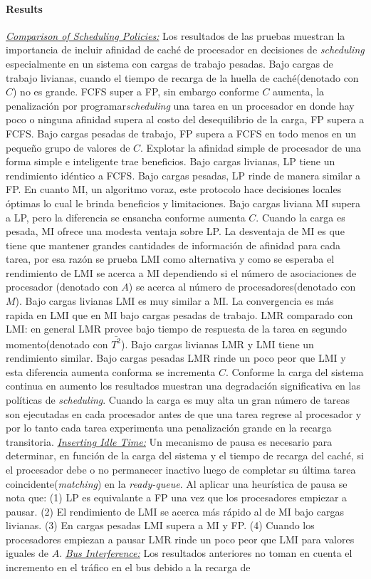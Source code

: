 \paragraph{\textnormal{\textbf{Results}}}
\underline{\textit{Comparison of Scheduling Policies:}} Los resultados de las pruebas muestran la importancia de incluir afinidad de caché de procesador en decisiones de \textit{scheduling} especialmente en un sistema con cargas de trabajo pesadas. Bajo cargas de trabajo livianas, cuando el tiempo de recarga de la huella de caché(denotado con $C$) no es grande. FCFS super a FP, sin embargo conforme $C$ aumenta, la penalización por programar\textit{scheduling} una tarea en un procesador en donde hay poco o ninguna afinidad supera al costo del desequilibrio de la carga, FP supera a FCFS. Bajo cargas pesadas de trabajo, FP supera a FCFS en todo menos en un pequeño grupo de valores de $C$. Explotar la afinidad simple de procesador de una forma simple e inteligente trae beneficios. Bajo cargas livianas, LP tiene un rendimiento idéntico a FCFS. Bajo cargas pesadas, LP rinde de manera similar a FP. En cuanto MI, un algoritmo voraz, este protocolo hace decisiones locales óptimas lo cual le brinda beneficios y limitaciones. Bajo cargas liviana MI supera a LP, pero la diferencia se ensancha conforme aumenta $C$. Cuando la carga es pesada, MI ofrece una modesta ventaja sobre LP. La desventaja de MI es que tiene que mantener grandes cantidades de información de afinidad para cada tarea, por esa razón se prueba LMI como alternativa y como se esperaba el rendimiento de LMI se acerca a MI dependiendo si el número de asociaciones de procesador (denotado con $A$) se acerca al número de procesadores(denotado con $M$). Bajo cargas livianas LMI es muy similar a MI. La convergencia es más rapida en LMI que en MI bajo cargas pesadas de trabajo. LMR comparado con LMI: en general LMR provee bajo tiempo de respuesta de la tarea en segundo momento(denotado con $\bar{T^2}$). Bajo cargas livianas LMR y LMI tiene un rendimiento similar. Bajo cargas pesadas LMR rinde un poco peor que LMI y esta diferencia aumenta conforma se incrementa $C$. Conforme la carga del sistema continua en aumento los resultados muestran una degradación significativa en las políticas de \textit{scheduling}. Cuando la carga es muy alta un gran número de tareas son ejecutadas en cada procesador antes de que una tarea regrese al procesador y por lo tanto cada tarea experimenta una penalización grande en la recarga transitoria. \underline{\textit{Inserting Idle Time:}} Un mecanismo de pausa es necesario para determinar, en función de la carga del sistema y el tiempo de recarga del caché, si el procesador debe o no permanecer inactivo luego de completar su última tarea coincidente(\textit{matching}) en la \textit{ready-queue}. Al aplicar una heurística de pausa se nota que: (1) LP es equivalante a FP una vez que los procesadores empiezar a pausar. (2) El rendimiento de LMI se acerca más rápido al de MI bajo cargas livianas. (3) En cargas pesadas LMI supera a MI y FP. (4) Cuando los procesadores empiezan a pausar LMR rinde un poco peor que LMI para valores iguales de $A$. \underline{\textit{Bus Interference:}} Los resultados anteriores no toman en cuenta el incremento en el tráfico en el bus debido a la recarga de 